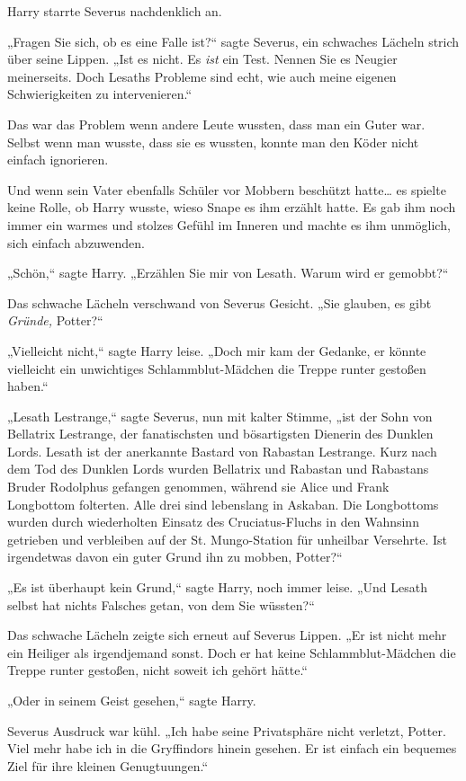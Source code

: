 {Harry starrte Severus nachdenklich an.

„Fragen Sie sich, ob es eine Falle ist?“ sagte Severus, ein schwaches Lächeln strich über seine Lippen. „Ist es nicht. Es \emph{ist} ein Test. Nennen Sie es Neugier meinerseits. Doch Lesaths Probleme sind echt, wie auch meine eigenen Schwierigkeiten zu intervenieren.“

Das war das Problem wenn andere Leute wussten, dass man ein Guter war. Selbst wenn man wusste, dass sie es wussten, konnte man den Köder nicht einfach ignorieren.

Und wenn sein Vater ebenfalls Schüler vor Mobbern beschützt hatte… es spielte keine Rolle, ob Harry wusste, wieso Snape es ihm erzählt hatte. Es gab ihm noch immer ein warmes und stolzes Gefühl im Inneren und machte es ihm unmöglich, sich einfach abzuwenden.

„Schön,“ sagte Harry. „Erzählen Sie mir von Lesath. Warum wird er gemobbt?“

Das schwache Lächeln verschwand von Severus Gesicht. „Sie glauben, es gibt \emph{Gründe,} Potter?“

„Vielleicht nicht,“ sagte Harry leise. „Doch mir kam der Gedanke, er könnte vielleicht ein unwichtiges Schlammblut-Mädchen die Treppe runter gestoßen haben.“

„Lesath Lestrange,“ sagte Severus, nun mit kalter Stimme, „ist der Sohn von Bellatrix Lestrange, der fanatischsten und bösartigsten Dienerin des Dunklen Lords. Lesath ist der anerkannte Bastard von Rabastan Lestrange. Kurz nach dem Tod des Dunklen Lords wurden Bellatrix und Rabastan und Rabastans Bruder Rodolphus gefangen genommen, während sie Alice und Frank Longbottom folterten. Alle drei sind lebenslang in Askaban. Die Longbottoms wurden durch wiederholten Einsatz des Cruciatus-Fluchs in den Wahnsinn getrieben und verbleiben auf der St. Mungo-Station für unheilbar Versehrte. Ist irgendetwas davon ein guter Grund ihn zu mobben, Potter?“

„Es ist überhaupt kein Grund,“ sagte Harry, noch immer leise. „Und Lesath selbst hat nichts Falsches getan, von dem Sie wüssten?“

Das schwache Lächeln zeigte sich erneut auf Severus Lippen. „Er ist nicht mehr ein Heiliger als irgendjemand sonst. Doch er hat keine Schlammblut-Mädchen die Treppe runter gestoßen, nicht soweit ich gehört hätte.“

„Oder in seinem Geist gesehen,“ sagte Harry.

Severus Ausdruck war kühl. „Ich habe seine Privatsphäre nicht verletzt, Potter. Viel mehr habe ich in die Gryffindors hinein gesehen. Er ist einfach ein bequemes Ziel für ihre kleinen Genugtuungen.“

}
